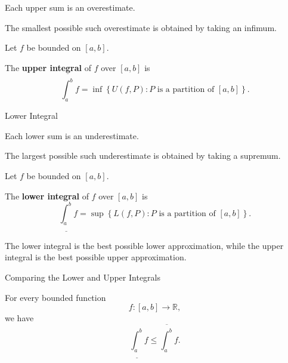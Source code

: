 \documentclass[12pt,a4paper]{article}
\begin{document}
Each upper sum is an overestimate.

The smallest possible such overestimate is obtained by taking an
infimum.

\begin{definition}
Let $f$ be bounded on $[a,b]$.

The \textbf{upper integral} of $f$ over $[a,b]$ is
\[
\overline{\int_a^b} f
=
\inf
\left\{
U(f,P):
P\text{ is a partition of }[a,b]
\right\}.
\]
\end{definition}

\clearpage

\begin{heading}
Lower Integral
\end{heading}

Each lower sum is an underestimate.

The largest possible such underestimate is obtained by taking a
supremum.

\begin{definition}
Let $f$ be bounded on $[a,b]$.

The \textbf{lower integral} of $f$ over $[a,b]$ is
\[
\underline{\int_a^b} f
=
\sup
\left\{
L(f,P):
P\text{ is a partition of }[a,b]
\right\}.
\]
\end{definition}

\vspace{20pt}

The lower integral is the best possible lower approximation, while
the upper integral is the best possible upper approximation.

\clearpage

\begin{heading}
Comparing the Lower and Upper Integrals
\end{heading}

\begin{theorem}
For every bounded function
\[
f:[a,b]\to\mathbb{R},
\]
we have
\[
\underline{\int_a^b} f
\le
\overline{\int_a^b} f.
\]
\end{theorem}

\clearpage
\end{document}
